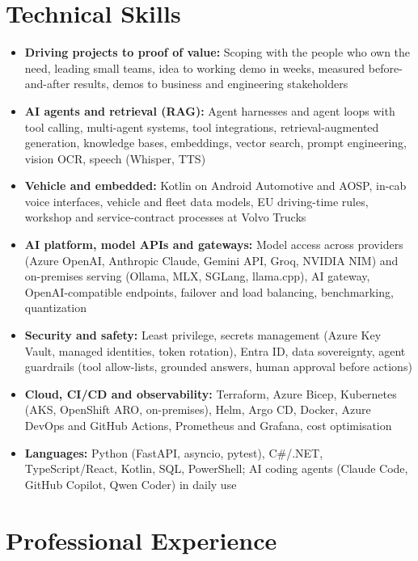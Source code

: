 \documentclass[a4paper,10pt]{article}
\begin{document}
\section*{Technical Skills}
\begin{itemize}
  \item \textbf{Driving projects to proof of value:} Scoping with the people who own the need, leading small teams, idea to working demo in weeks, measured before-and-after results, demos to business and engineering stakeholders
  \item \textbf{AI agents and retrieval (RAG):} Agent harnesses and agent loops with tool calling, multi-agent systems, tool integrations, retrieval-augmented generation, knowledge bases, embeddings, vector search, prompt engineering, vision OCR, speech (Whisper, TTS)
  \item \textbf{Vehicle and embedded:} Kotlin on Android Automotive and AOSP, in-cab voice interfaces, vehicle and fleet data models, EU driving-time rules, workshop and service-contract processes at Volvo Trucks
  \item \textbf{AI platform, model APIs and gateways:} Model access across providers (Azure OpenAI, Anthropic Claude, Gemini API, Groq, NVIDIA NIM) and on-premises serving (Ollama, MLX, SGLang, llama.cpp), AI gateway, OpenAI-compatible endpoints, failover and load balancing, benchmarking, quantization
  \item \textbf{Security and safety:} Least privilege, secrets management (Azure Key Vault, managed identities, token rotation), Entra ID, data sovereignty, agent guardrails (tool allow-lists, grounded answers, human approval before actions)
  \item \textbf{Cloud, CI/CD and observability:} Terraform, Azure Bicep, Kubernetes (AKS, OpenShift ARO, on-premises), Helm, Argo CD, Docker, Azure DevOps and GitHub Actions, Prometheus and Grafana, cost optimisation
  \item \textbf{Languages:} Python (FastAPI, asyncio, pytest), C\#/.NET, TypeScript/React, Kotlin, SQL, PowerShell; AI coding agents (Claude Code, GitHub Copilot, Qwen Coder) in daily use
\end{itemize}

\section*{Professional Experience}
\end{document}
